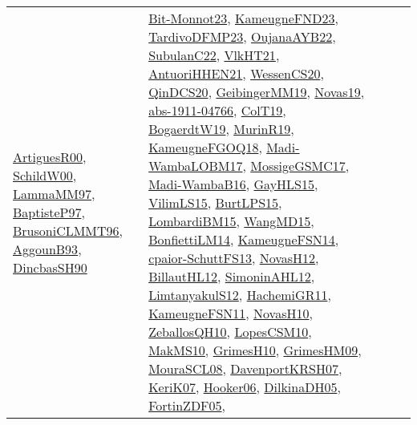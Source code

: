 {\begin{longtable}{lp{3cm}>{\raggedright}p{6cm}>{\raggedright}p{6cm}p{8cm}}
\href{articles/ArtiguesR00.pdf}{ArtiguesR00}\cite{ArtiguesR00}, \href{articles/SchildW00.pdf}{SchildW00}\cite{SchildW00}, \href{articles/LammaMM97.pdf}{LammaMM97}\cite{LammaMM97}, \href{papers/BaptisteP97.pdf}{BaptisteP97}\cite{BaptisteP97}, \href{papers/BrusoniCLMMT96.pdf}{BrusoniCLMMT96}\cite{BrusoniCLMMT96}, \href{articles/AggounB93.pdf}{AggounB93}\cite{AggounB93}, \href{articles/DincbasSH90.pdf}{DincbasSH90}\cite{DincbasSH90} & \href{papers/Bit-Monnot23.pdf}{Bit-Monnot23}\cite{Bit-Monnot23}, \href{papers/KameugneFND23.pdf}{KameugneFND23}\cite{KameugneFND23}, \href{papers/TardivoDFMP23.pdf}{TardivoDFMP23}\cite{TardivoDFMP23}, \href{papers/OujanaAYB22.pdf}{OujanaAYB22}\cite{OujanaAYB22}, \href{articles/SubulanC22.pdf}{SubulanC22}\cite{SubulanC22}, \href{articles/VlkHT21.pdf}{VlkHT21}\cite{VlkHT21}, \href{papers/AntuoriHHEN21.pdf}{AntuoriHHEN21}\cite{AntuoriHHEN21}, \href{papers/WessenCS20.pdf}{WessenCS20}\cite{WessenCS20}, \href{articles/QinDCS20.pdf}{QinDCS20}\cite{QinDCS20}, \href{papers/GeibingerMM19.pdf}{GeibingerMM19}\cite{GeibingerMM19}, \href{articles/Novas19.pdf}{Novas19}\cite{Novas19}, \href{articles/abs-1911-04766.pdf}{abs-1911-04766}\cite{abs-1911-04766}, \href{papers/ColT19.pdf}{ColT19}\cite{ColT19}, \href{papers/BogaerdtW19.pdf}{BogaerdtW19}\cite{BogaerdtW19}, \href{papers/MurinR19.pdf}{MurinR19}\cite{MurinR19}, \href{papers/KameugneFGOQ18.pdf}{KameugneFGOQ18}\cite{KameugneFGOQ18}, \href{papers/Madi-WambaLOBM17.pdf}{Madi-WambaLOBM17}\cite{Madi-WambaLOBM17}, \href{papers/MossigeGSMC17.pdf}{MossigeGSMC17}\cite{MossigeGSMC17}, \href{papers/Madi-WambaB16.pdf}{Madi-WambaB16}\cite{Madi-WambaB16}, \href{papers/GayHLS15.pdf}{GayHLS15}\cite{GayHLS15}, \href{papers/VilimLS15.pdf}{VilimLS15}\cite{VilimLS15}, \href{papers/BurtLPS15.pdf}{BurtLPS15}\cite{BurtLPS15}, \href{papers/LombardiBM15.pdf}{LombardiBM15}\cite{LombardiBM15}, \href{articles/WangMD15.pdf}{WangMD15}\cite{WangMD15}, \href{papers/BonfiettiLM14.pdf}{BonfiettiLM14}\cite{BonfiettiLM14}, \href{articles/KameugneFSN14.pdf}{KameugneFSN14}\cite{KameugneFSN14}, \href{papers/cpaior-SchuttFS13.pdf}{cpaior-SchuttFS13}\cite{cpaior-SchuttFS13}, \href{articles/NovasH12.pdf}{NovasH12}\cite{NovasH12}, \href{papers/BillautHL12.pdf}{BillautHL12}\cite{BillautHL12}, \href{papers/SimoninAHL12.pdf}{SimoninAHL12}\cite{SimoninAHL12}, \href{articles/LimtanyakulS12.pdf}{LimtanyakulS12}\cite{LimtanyakulS12}, \href{articles/HachemiGR11.pdf}{HachemiGR11}\cite{HachemiGR11}, \href{papers/KameugneFSN11.pdf}{KameugneFSN11}\cite{KameugneFSN11}, \href{articles/NovasH10.pdf}{NovasH10}\cite{NovasH10}, \href{articles/ZeballosQH10.pdf}{ZeballosQH10}\cite{ZeballosQH10}, \href{articles/LopesCSM10.pdf}{LopesCSM10}\cite{LopesCSM10}, \href{papers/MakMS10.pdf}{MakMS10}\cite{MakMS10}, \href{papers/GrimesH10.pdf}{GrimesH10}\cite{GrimesH10}, \href{papers/GrimesHM09.pdf}{GrimesHM09}\cite{GrimesHM09}, \href{papers/MouraSCL08.pdf}{MouraSCL08}\cite{MouraSCL08}, \href{papers/DavenportKRSH07.pdf}{DavenportKRSH07}\cite{DavenportKRSH07}, \href{papers/KeriK07.pdf}{KeriK07}\cite{KeriK07}, \href{articles/Hooker06.pdf}{Hooker06}\cite{Hooker06}, \href{papers/DilkinaDH05.pdf}{DilkinaDH05}\cite{DilkinaDH05}, \href{papers/FortinZDF05.pdf}{FortinZDF05}\cite{FortinZDF05}, 
\end{longtable}}
